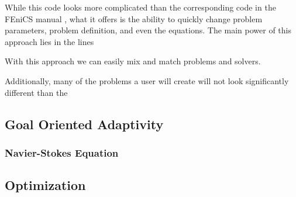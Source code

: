     

    While this code looks more complicated than the corresponding code in the
    FEniCS manual \cite[Section 1.1.3]{Alnae2011}, what it offers is the ability
    to quickly change problem parameters, problem definition, and even the
    equations. The main power of this approach lies in the lines
    
    With this approach we can easily mix and match problems and solvers.

    Additionally, many of the problems a user will create will not look
    significantly different than the

\subsection{Goal Oriented Adaptivity} \label{sse:Adaptivity}

\subsubsection{Navier-Stokes Equation} \label{sss:NSE}

\subsection{Optimization} \label{sse:Optimization}

